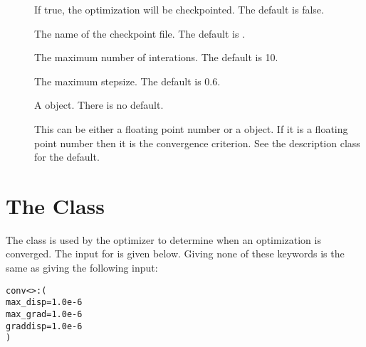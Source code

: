\begin{description}
  \item[] If true, the optimization will be checkpointed.
     The default is false.

  \item[] The name of the checkpoint file.
     The default is .

  \item[] The maximum number of interations.
     The default is 10.

  \item[] The maximum stepsize.  The default is 0.6.

  \item[] A  object.  There is
     no default.

  \item[] This can be either a floating point number
     or a  object.  If it is a floating point
     number then it is the convergence criterion.  See the description
      class for the default.

\end{description}


\section{The  Class}\label{Convergence}

The  class is used by the optimizer to determine
when an optimization is converged.  The  input for
 is given below.  Giving none of these keywords 
is the same as giving the following input:
\begin{alltt}
  conv<>: (
    max_disp = 1.0e-6
    max_grad = 1.0e-6
    graddisp = 1.0e-6
  )
\end{alltt}

